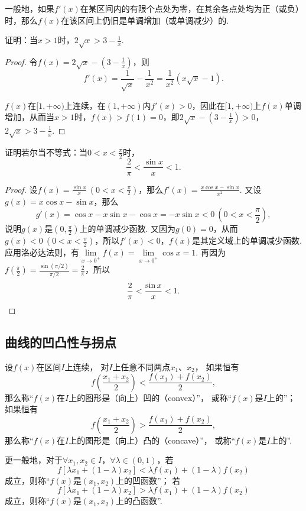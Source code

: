 一般地，如果\(f'(x)\)在某区间内的有限个点处为零，在其余各点处均为正（或负）时，那么\(f(x)\)在该区间上仍旧是单调增加（或单调减少）的.

\begin{example}
证明：当\(x > 1\)时，\(2 \sqrt{x} > 3 - \frac{1}{x}\).
\begin{proof}
令\(f(x) = 2 \sqrt{x} - \left(3 - \frac{1}{x}\right)\)，则\[
f'(x) = \frac{1}{\sqrt{x}} - \frac{1}{x^2}
= \frac{1}{x^2} (x \sqrt{x} - 1).
\]

\(f(x)\)在\([1,+\infty)\)上连续，在\((1,+\infty)\)内\(f'(x) > 0\)，因此在\([1,+\infty)\)上\(f(x)\)单调增加，从而当\(x > 1\)时，\(f(x) > f(1) = 0\)，即\(2 \sqrt{x} - \left(3 - \frac{1}{x}\right) > 0\)，\(2 \sqrt{x} > 3 - \frac{1}{x}\).
\end{proof}
\end{example}

\begin{example}
证明若尔当不等式：当\(0<x<\frac{\pi}{2}\)时，\begin{equation}\label{equation:微分中值定理.若尔当不等式}
\frac{2}{\pi} < \frac{\sin x}{x} < 1.
\end{equation}
\begin{proof}
设\(f(x) = \frac{\sin x}{x}\ (0<x<\frac{\pi}{2})\)，那么\(f'(x) = \frac{x\cos x - \sin x}{x^2}\).
又设\(g(x) = x \cos x - \sin x\)，那么\[
g'(x) = \cos x - x \sin x - \cos x = -x \sin x < 0\ (0<x<\frac{\pi}{2}),
\]说明\(g(x)\)是\((0,\frac{\pi}{2})\)上的单调减少函数.
又因为\(g(0) = 0\)，从而\(g(x) < 0\ (0<x<\frac{\pi}{2})\)，所以\(f'(x) < 0\)，\(f(x)\)是其定义域上的单调减少函数.
应用洛必达法则，有\(\lim\limits_{x\to0^+} f(x) = \lim\limits_{x\to0^+} \cos x = 1\).
再因为\(f(\frac{\pi}{2}) = \frac{\sin(\pi/2)}{\pi/2} = \frac{2}{\pi}\)，所以\[
\frac{2}{\pi} < \frac{\sin x}{x} < 1.
\qedhere
\]
\end{proof}
\end{example}


\subsection{曲线的凹凸性与拐点}
\begin{definition}[曲线的凹凸性]
设\(f(x)\)在区间\(I\)上连续，
对\(I\)上任意不同两点\(x_1\)、\(x_2\)，
如果恒有\[f\left(\frac{x_1+x_2}{2}\right) < \frac{f(x_1)+f(x_2)}{2},\]
那么称“\(f(x)\)在\(I\)上的图形是（向上）凹的（convex）”，
或称“\(f(x)\)是\(I\)上的”；
如果恒有\[f\left(\frac{x_1+x_2}{2}\right) > \frac{f(x_1)+f(x_2)}{2},\]
那么称“\(f(x)\)在\(I\)上的图形是（向上）凸的（concave）”，
或称“\(f(x)\)是\(I\)上的”.
\end{definition}
更一般地，对于\(\forall x_1,x_2 \in I\)，\(\forall \lambda \in (0,1)\)，若\[
f[\lambda x_1 + (1-\lambda) x_2] < \lambda f(x_1) + (1 - \lambda) f(x_2)
\]成立，则称“\(f(x)\)是\((x_1,x_2)\)上的凹函数”；
若\[
f[\lambda x_1 + (1-\lambda) x_2] > \lambda f(x_1) + (1-\lambda) f(x_2)
\]成立，则称“\(f(x)\)是\((x_1,x_2)\)上的凸函数”.

